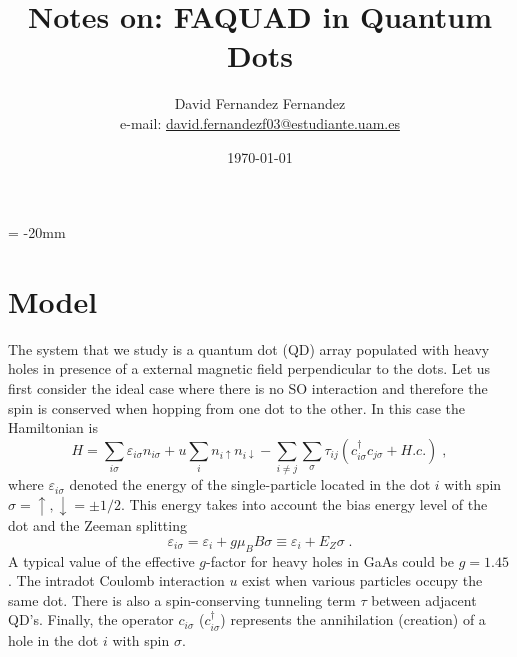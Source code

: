 \documentclass[a4paper,11pt]{article}
\begin{document}
   \droptitle = -20mm
   \title{Notes on: FAQUAD in Quantum Dots}

   \author{David Fernandez Fernandez \\ e-mail: \href{mailto:david.fernandezf03@estudiante.uam.es}{david.fernandezf03@estudiante.uam.es}}
   
   \date{\today}

   \maketitle
   
   \tableofcontents
    

\section{Model}

The system that we study is a quantum dot (QD) array populated with heavy holes in presence of a external magnetic field perpendicular to the dots. Let us first consider the ideal case where there is no SO interaction and therefore the spin is conserved when hopping from one dot to the other. In this case the Hamiltonian is
\begin{equation}
H=\sum_{i\sigma}\varepsilon_{i\sigma}n_{i\sigma}+u\sum_in_{i\uparrow}n_{i\downarrow}-\sum_{i\neq j}\sum_\sigma\tau_{ij}\left(c_{i\sigma}^\dagger c_{j\sigma}+H.c.\right)\; ,
\label{eq:Hubbard_model}
\end{equation}
where $\varepsilon_{i\sigma}$ denoted the energy of the single-particle located in the dot $i$ with spin $\sigma=\uparrow,\downarrow=\pm1/2$. This energy takes into account the bias energy level of the dot and the Zeeman splitting
\begin{equation}
\varepsilon_{i\sigma}=\varepsilon_i+g\mu_B B\sigma\equiv \varepsilon_i+E_Z\sigma\; .
\end{equation}
A typical value of the effective $g$-factor for heavy holes in GaAs could be $g=1.45$\cite{Bogan2017}. The intradot Coulomb interaction $u$ exist when various particles occupy the same dot. There is also a spin-conserving tunneling term $\tau$ between adjacent QD's. Finally, the operator $c_{i\sigma}$ ($c_{i\sigma}^{\dagger}$) represents the annihilation (creation) of a hole in the dot $i$ with spin $\sigma$.
\end{document}
